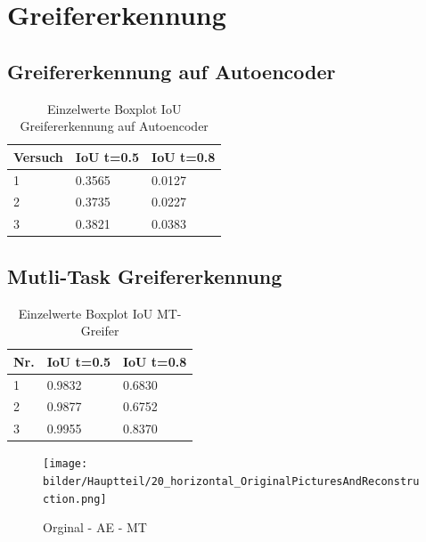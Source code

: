 \chapter{Greifererkennung}
\label{appendix:Greifererkennung}

\section{Greifererkennung auf Autoencoder}
\label{appendix:GreifererkennungAufAutoencoder}

\begin{table}[ht]
	\centering
	\begin{tabularx}{\textwidth}{lll}
		\textbf{Versuch}  & \textbf{IoU t=0.5} & \textbf{IoU t=0.8}  	 \\ \hline 
		1 & 0.3565 & 0.0127 \\
		2 & 0.3735 & 0.0227 \\
		3 & 0.3821 & 0.0383 \\ 
	\end{tabularx}
	\caption{Einzelwerte Boxplot IoU Greifererkennung auf Autoencoder}
	\label{table:EinzelwerteBoxplotIoUGreifererkennungaufAutoencoder}
\end{table}

\section{Mutli-Task Greifererkennung}
\label{appendix:MutliTaskGreifererkennung}

\begin{table}[ht]
	\centering
	\begin{tabularx}{\textwidth}{lll}
		\textbf{Nr.}  & \textbf{IoU t=0.5} & \textbf{IoU t=0.8}  	 \\ \hline 
		1 & 0.9832 & 0.6830 \\
		2 & 0.9877 & 0.6752 \\
		3 & 0.9955 & 0.8370 \\

	\end{tabularx}
	\caption{Einzelwerte Boxplot IoU MT-Greifer}
	\label{table:EinzelwerteBoxplotIoUMTGreifer}
\end{table}



\begin{figure}[h]
	\centering
	\texttt{[image: bilder/Hauptteil/20\_horizontal\_OriginalPicturesAndReconstruction.png]}
	\caption{Orginal -  AE - MT}
	\label{img:AppendixReconstruction}	
\end{figure}



